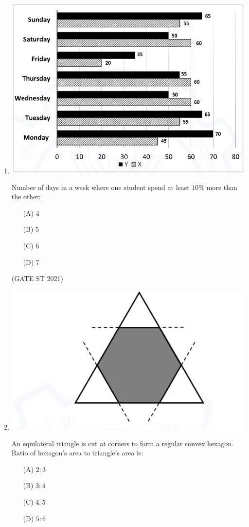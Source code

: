 \documentclass[journal,12pt,onecolumn]{IEEEtran}
\theoremstyle{remark}
\begin{document}
\begin{enumerate}
\item
   \includegraphics[width=1\linewidth]{figs/4.png} 
  
Number of days in a week where one student spend at least $10\%$ more than the other:

\begin{enumerate}
\item[(A)] 4
\item[(B)] 5
\item[(C)] 6
\item[(D)] 7
\end{enumerate}

\hfill (GATE ST 2021) \\
\newpage


\item 
 \includegraphics[width=0.4\linewidth]{figs/5.png} 

An equilateral triangle is cut at corners to form a regular convex hexagon.  
Ratio of hexagon's area to triangle's area is:

\begin{enumerate}
\item[(A)] $2:3$
\item[(B)] $3:4$
\item[(C)] $4:5$
\item[(D)] $5:6$
\end{enumerate}


\end{enumerate}
\end{document}

